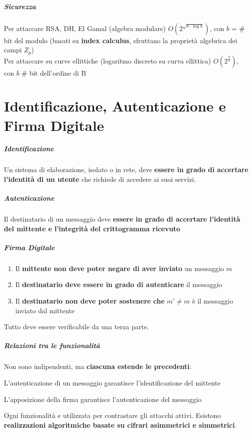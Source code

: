 \documentclass[10pt]{book}
\begin{document}
\paragraph{Sicurezza} Per attaccare RSA, DH, El Gamal (algebra modulare) $O(2^{\sqrt{b\cdot\log b}})$, con $b$ = \# bit del modulo (basati su \textbf{index calculus}, sfruttano la proprietà algebrica dei campi $Z_p$)\\
Per attaccare su curve ellittiche (logaritmo discreto su curva ellittica) $O(2^{\frac{b}{2}})$, con $b$ \# bit dell'ordine di B
\chapter{Identificazione, Autenticazione e Firma Digitale}
\paragraph{Identificazione} Un sistema di elaborazione, isolato o in rete, deve \textbf{essere in grado di accertare l'identità di un utente} che richiede di accedere ai suoi servizi.
\paragraph{Autenticazione} Il destinatario di un messaggio deve \textbf{essere in grado di accertare l'identità del mittente e l'integrità del crittogramma ricevuto}
\paragraph{Firma Digitale} \begin{enumerate}
	\item Il \textbf{mittente non deve poter negare di aver inviato} un messaggio $m$
	\item Il \textbf{destinatario deve essere in grado di autenticare} il messaggio
	\item Il \textbf{destinatario non deve poter sostenere che} $m'\neq m$ è il messaggio inviato dal mittente
\end{enumerate}
Tutto deve essere verificabile da una terza parte.
\paragraph{Relazioni tra le funzionalità} Non sono indipendenti, ma \textbf{ciascuna estende le precedenti}:
\begin{list}{}{}
	\item L'autenticazione di un messaggio garantisce l'identificazione del mittente
	\item L'apposizione della firma garantisce l'autenticazione del messaggio
\end{list}
Ogni funzionalità e utilizzata per contrastare gli attacchi attivi. Esistono \textbf{realizzazioni algoritmiche basate su cifrari asimmetrici e simmetrici}.
\end{document}
